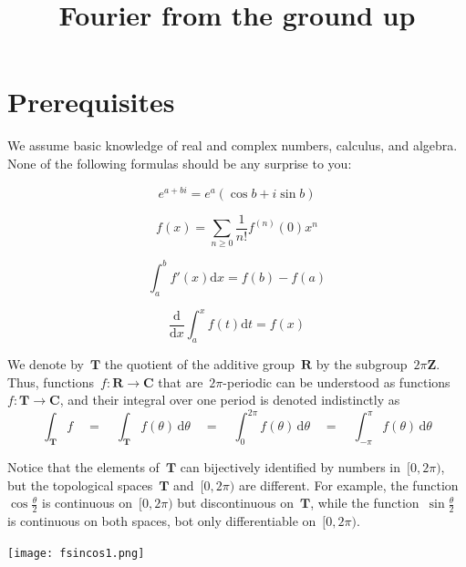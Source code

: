 \title{Fourier from the ground up}

\newcommand{\Z}{\mathbf{Z}}
\newcommand{\Q}{\mathbf{Q}}
\newcommand{\R}{\mathbf{R}}
\newcommand{\C}{\mathbf{C}}
\newcommand{\T}{\mathbf{T}}
\newcommand{\PP}{\mathcal{P}}
\newcommand{\ud}{\mathrm{d}}
\newcommand{\ds}{\displaystyle}
\newcommand{\DFT}{\mathtt{DFT}}
\newcommand{\IDFT}{\mathtt{IDFT}}



\clearpage
\section{Prerequisites}

We assume basic knowledge of real and complex numbers, calculus, and algebra.
None of the following formulas should be any surprise to you:

$$e^{a + bi}=e^a\left(\cos b+i\sin b\right)$$


$$ f(x)=
\sum_{n\ge0}\frac{1}{n!}f^{(n)}(0)x^n$$

$$ \int_a^b f'(x)\ud x = f(b) - f(a) $$

$$ \frac{\ud}{\ud x}\int_a^x f(t)\ud t = f(x) $$

\vfill

We denote by~$\T$ the quotient of the additive group~$\R$ by the
subgroup~$2\pi\Z$.  Thus, functions~$f:\R\to\C$ that are~$2\pi$-periodic can
be understood as functions~$f:\T\to\C$, and their integral over one period is
denoted indistinctly as
$$
\int_\T f
\quad = \quad
\int_\T f(\theta)\,\ud\theta
\quad = \quad
\int_0^{2\pi} f(\theta)\,\ud\theta
\quad = \quad
\int_{-\pi}^{\pi} f(\theta)\,\ud\theta
$$

Notice that the elements of~$\T$ can bijectively identified by numbers
in~$[0,2\pi)$, but the topological spaces~$\T$ and~$[0,2\pi)$ are different.
For example, the function~$\cos\frac\theta2$ is continuous on~$[0,2\pi)$
but discontinuous on~$\T$, while the function~$\sin\frac\theta2$ is
continuous on both spaces, bot only differentiable on~$[0,2\pi)$.

\texttt{[image: fsincos1.png]}

\vfill

